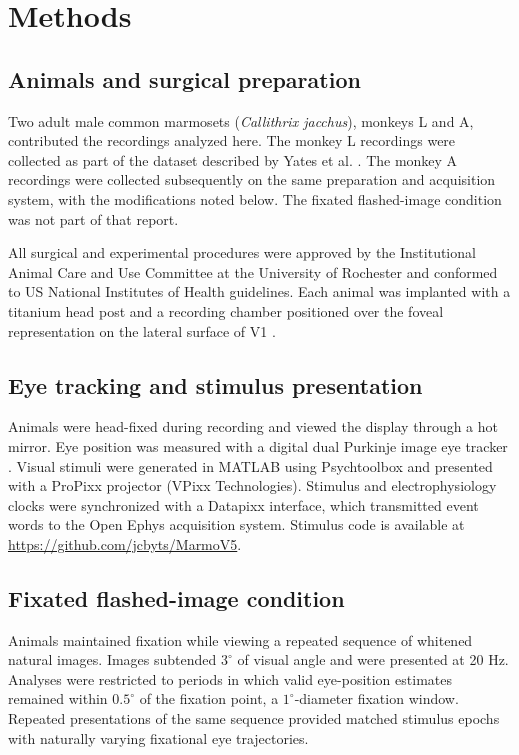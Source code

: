 \documentclass{lite}
\begin{document}
\section{Methods}

\subsection{Animals and surgical preparation}

Two adult male common marmosets (\textit{Callithrix jacchus}), monkeys L and A, contributed the recordings analyzed here. The monkey L recordings were collected as part of the dataset described by Yates et al. \cite{yates2023detailed}. The monkey A recordings were collected subsequently on the same preparation and acquisition system, with the modifications noted below. The fixated flashed-image condition was not part of that report.

All surgical and experimental procedures were approved by the Institutional Animal Care and Use Committee at the University of Rochester and conformed to US National Institutes of Health guidelines. Each animal was implanted with a titanium head post and a recording chamber positioned over the foveal representation on the lateral surface of V1 \cite{yates2023detailed}.

\subsection{Eye tracking and stimulus presentation}

Animals were head-fixed during recording and viewed the display through a hot mirror. Eye position was measured with a digital dual Purkinje image eye tracker \cite{yates2023detailed, wu2023high, ressmeyer2025openirisdpi}. Visual stimuli were generated in MATLAB using Psychtoolbox \cite{kleiner2007s} and presented with a ProPixx projector (VPixx Technologies). Stimulus and electrophysiology clocks were synchronized with a Datapixx interface, which transmitted event words to the Open Ephys acquisition system. Stimulus code is available at \url{https://github.com/jcbyts/MarmoV5}.

\subsection{Fixated flashed-image condition}

Animals maintained fixation while viewing a repeated sequence of whitened natural images. Images subtended $3^\circ$ of visual angle and were presented at 20 Hz. Analyses were restricted to periods in which valid eye-position estimates remained within $0.5^\circ$ of the fixation point, a $1^\circ$-diameter fixation window. Repeated presentations of the same sequence provided matched stimulus epochs with naturally varying fixational eye trajectories.
\end{document}
